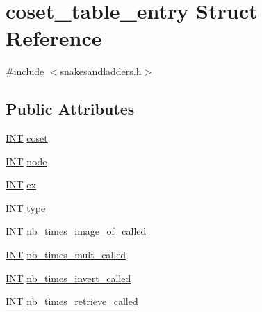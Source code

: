 \hypertarget{structcoset__table__entry}{}\section{coset\+\_\+table\+\_\+entry Struct Reference}
\label{structcoset__table__entry}


{\ttfamily \#include $<$snakesandladders.\+h$>$}

\subsection*{Public Attributes}
\begin{DoxyCompactItemize}
\item 
\mbox{\hyperlink{galois_8h_a09fddde158a3a20bd2dcadb609de11dc}{I\+NT}} \mbox{\hyperlink{structcoset__table__entry_a43faf472501b13d5c20886c82194cd74}{coset}}
\item 
\mbox{\hyperlink{galois_8h_a09fddde158a3a20bd2dcadb609de11dc}{I\+NT}} \mbox{\hyperlink{structcoset__table__entry_a26fa782fc3c055af9498076cc1ca17fb}{node}}
\item 
\mbox{\hyperlink{galois_8h_a09fddde158a3a20bd2dcadb609de11dc}{I\+NT}} \mbox{\hyperlink{structcoset__table__entry_aa46d3d76c1a5a90b293f10b3d70ecbe1}{ex}}
\item 
\mbox{\hyperlink{galois_8h_a09fddde158a3a20bd2dcadb609de11dc}{I\+NT}} \mbox{\hyperlink{structcoset__table__entry_af8ed5647e3903c6db930fc71c84e4b3a}{type}}
\item 
\mbox{\hyperlink{galois_8h_a09fddde158a3a20bd2dcadb609de11dc}{I\+NT}} \mbox{\hyperlink{structcoset__table__entry_a6647502d3fdf771eeb3203c66ba3f9cb}{nb\+\_\+times\+\_\+image\+\_\+of\+\_\+called}}
\item 
\mbox{\hyperlink{galois_8h_a09fddde158a3a20bd2dcadb609de11dc}{I\+NT}} \mbox{\hyperlink{structcoset__table__entry_a34ff947f6bc248da8c86461617b89253}{nb\+\_\+times\+\_\+mult\+\_\+called}}
\item 
\mbox{\hyperlink{galois_8h_a09fddde158a3a20bd2dcadb609de11dc}{I\+NT}} \mbox{\hyperlink{structcoset__table__entry_a8fe23035c9279bdc517ee10ae8486fe3}{nb\+\_\+times\+\_\+invert\+\_\+called}}
\item 
\mbox{\hyperlink{galois_8h_a09fddde158a3a20bd2dcadb609de11dc}{I\+NT}} \mbox{\hyperlink{structcoset__table__entry_ac95df07e086bd4faecd355b2eca786bb}{nb\+\_\+times\+\_\+retrieve\+\_\+called}}
\end{DoxyCompactItemize}


